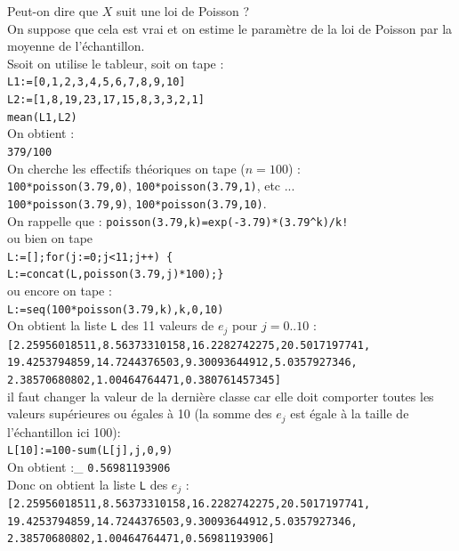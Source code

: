 \documentclass[a4paper,11pt]{book}
\begin{document}
Peut-on dire que $X$ suit une loi de Poisson ?\\
On suppose que cela est vrai et on estime le param\`etre de la loi de Poisson
par la moyenne de l'\'echantillon.\\
Ssoit on utilise le tableur, soit on tape :\\
{\tt L1:=[0,1,2,3,4,5,6,7,8,9,10]}\\
{\tt L2:=[1,8,19,23,17,15,8,3,3,2,1]}\\
{\tt mean(L1,L2)}\\
On obtient :\\
{\tt 379/100} \\
On cherche les effectifs th\'eoriques on tape ($n=100$) :\\
{\tt 100*poisson(3.79,0)}, {\tt 100*poisson(3.79,1)}, etc ...\\
{\tt 100*poisson(3.79,9)}, {\tt 100*poisson(3.79,10)}.\\
On rappelle que : {\tt poisson(3.79,k)=exp(-3.79)*(3.79\verb|^|k)/k!}\\
ou bien on tape \\
{\tt L:=[];for(j:=0;j<11;j++) \{}\\
{\tt L:=concat(L,poisson(3.79,j)*100);\}}\\
ou encore on tape :\\
{\tt L:=seq(100*poisson(3.79,k),k,0,10)}\\
On obtient la liste {\tt L} des 11 valeurs de $e_j$ pour $j=0..10$ :\\
{\tt [2.25956018511,8.56373310158,16.2282742275,20.5017197741,}\\
{\tt 19.4253794859,14.7244376503,9.30093644912,5.0357927346,}\\
{\tt 2.38570680802,1.00464764471,0.380761457345]} \\
il faut changer la valeur de la derni\`ere classe car elle doit comporter 
toutes les valeurs sup\'erieures ou \'egales \`a 10 (la somme des $e_j$ est 
\'egale \`a la taille de l'\'echantillon ici 100):\\ 
{\tt L[10]:=100-sum(L[j],j,0,9)}\\
On obtient :\_
{\tt 0.56981193906}\\
Donc on obtient la liste {\tt L} des $e_j$ :\\
{\tt [2.25956018511,8.56373310158,16.2282742275,20.5017197741,}\\
{\tt 19.4253794859,14.7244376503,9.30093644912,5.0357927346,}\\
{\tt 2.38570680802,1.00464764471,0.56981193906]} \\
\end{document}
